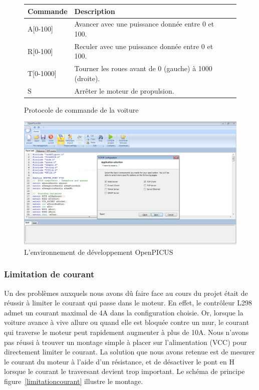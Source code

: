 \documentclass[a4paper,12pt]{report}
\begin{document}
\begin{figure}[!h]
	\small
	\begin{center}
		\begin{tabular}{|l|l|l|l|}
		\hline
		\texttt{} \footnotesize\bf{Commande} & \footnotesize\bf{Description} \\ \hline
			\texttt{} A[0-100]  & Avancer avec une puissance donnée entre 0 et 100. \\ \hline
			\texttt{} R[0-100]  & Reculer avec une puissance donnée entre 0 et 100. \\ \hline
			\texttt{} T[0-1000]  & Tourner les roues avant de 0 (gauche) à 1000 (droite). \\ \hline
			\texttt{} S  & Arrêter le moteur de propulsion. \\ \hline
		\end{tabular}
	\end{center}
	\caption{Protocole de commande de la voiture} 
	\label{tableaucommandes}
\end{figure}

\begin{figure}[!h]
	\begin{center}
		\includegraphics[scale=0.3]{images/openpicus.jpg}
	\end{center}
	\caption{L'environnement de développement OpenPICUS} 
	\label{openpicus}
\end{figure}
			
			\subsubsection{Limitation de courant}
			Un des problèmes auxquels nous avons dû faire face  au cours du projet était de réussir à limiter le courant qui passe dans le moteur. En effet, le contrôleur L298 admet un courant maximal de 4A dans la configuration choisie. Or, lorsque la voiture avance à vive allure ou quand elle est bloquée contre un mur, le courant qui traverse le moteur peut rapidement augmenter à plus de 10A.
Nous n’avons pas réussi à trouver un montage simple à placer sur l’alimentation (VCC) pour directement  limiter le courant. La solution que nous avons retenue est de mesurer le courant du moteur à l’aide d’un résistance, et de désactiver le pont en H lorsque le courant le traversant devient trop important. Le schéma de principe figure~\ref{limitationcourant} illustre le montage.
\end{document}
